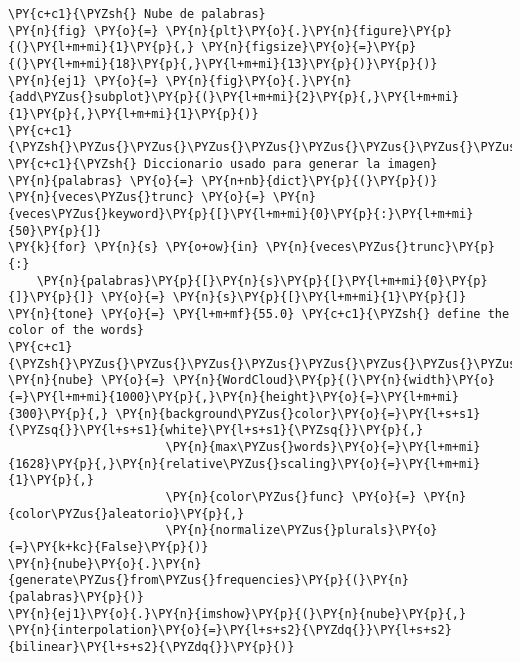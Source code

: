 \begin{tcolorbox}[breakable, size=fbox, boxrule=1pt, pad at break*=1mm,colback=cellbackground, colframe=cellborder]
\begin{Verbatim}[commandchars=\\\{\}]
\PY{c+c1}{\PYZsh{} Nube de palabras}
\PY{n}{fig} \PY{o}{=} \PY{n}{plt}\PY{o}{.}\PY{n}{figure}\PY{p}{(}\PY{l+m+mi}{1}\PY{p}{,} \PY{n}{figsize}\PY{o}{=}\PY{p}{(}\PY{l+m+mi}{18}\PY{p}{,}\PY{l+m+mi}{13}\PY{p}{)}\PY{p}{)}
\PY{n}{ej1} \PY{o}{=} \PY{n}{fig}\PY{o}{.}\PY{n}{add\PYZus{}subplot}\PY{p}{(}\PY{l+m+mi}{2}\PY{p}{,}\PY{l+m+mi}{1}\PY{p}{,}\PY{l+m+mi}{1}\PY{p}{)}
\PY{c+c1}{\PYZsh{}\PYZus{}\PYZus{}\PYZus{}\PYZus{}\PYZus{}\PYZus{}\PYZus{}\PYZus{}\PYZus{}\PYZus{}\PYZus{}\PYZus{}\PYZus{}\PYZus{}\PYZus{}\PYZus{}\PYZus{}\PYZus{}\PYZus{}\PYZus{}\PYZus{}\PYZus{}\PYZus{}\PYZus{}\PYZus{}\PYZus{}\PYZus{}\PYZus{}\PYZus{}\PYZus{}\PYZus{}\PYZus{}\PYZus{}\PYZus{}\PYZus{}\PYZus{}\PYZus{}\PYZus{}\PYZus{}\PYZus{}\PYZus{}\PYZus{}\PYZus{}\PYZus{}\PYZus{}\PYZus{}\PYZus{}\PYZus{}\PYZus{}\PYZus{}\PYZus{}\PYZus{}\PYZus{}\PYZus{}\PYZus{}}
\PY{c+c1}{\PYZsh{} Diccionario usado para generar la imagen}
\PY{n}{palabras} \PY{o}{=} \PY{n+nb}{dict}\PY{p}{(}\PY{p}{)}
\PY{n}{veces\PYZus{}trunc} \PY{o}{=} \PY{n}{veces\PYZus{}keyword}\PY{p}{[}\PY{l+m+mi}{0}\PY{p}{:}\PY{l+m+mi}{50}\PY{p}{]}
\PY{k}{for} \PY{n}{s} \PY{o+ow}{in} \PY{n}{veces\PYZus{}trunc}\PY{p}{:}
    \PY{n}{palabras}\PY{p}{[}\PY{n}{s}\PY{p}{[}\PY{l+m+mi}{0}\PY{p}{]}\PY{p}{]} \PY{o}{=} \PY{n}{s}\PY{p}{[}\PY{l+m+mi}{1}\PY{p}{]}
\PY{n}{tone} \PY{o}{=} \PY{l+m+mf}{55.0} \PY{c+c1}{\PYZsh{} define the color of the words}
\PY{c+c1}{\PYZsh{}\PYZus{}\PYZus{}\PYZus{}\PYZus{}\PYZus{}\PYZus{}\PYZus{}\PYZus{}\PYZus{}\PYZus{}\PYZus{}\PYZus{}\PYZus{}\PYZus{}\PYZus{}\PYZus{}\PYZus{}\PYZus{}\PYZus{}\PYZus{}\PYZus{}\PYZus{}\PYZus{}\PYZus{}\PYZus{}\PYZus{}\PYZus{}\PYZus{}\PYZus{}\PYZus{}\PYZus{}\PYZus{}\PYZus{}\PYZus{}\PYZus{}\PYZus{}\PYZus{}\PYZus{}\PYZus{}\PYZus{}\PYZus{}\PYZus{}\PYZus{}\PYZus{}\PYZus{}\PYZus{}\PYZus{}\PYZus{}\PYZus{}\PYZus{}\PYZus{}\PYZus{}\PYZus{}\PYZus{}\PYZus{}\PYZus{}}
\PY{n}{nube} \PY{o}{=} \PY{n}{WordCloud}\PY{p}{(}\PY{n}{width}\PY{o}{=}\PY{l+m+mi}{1000}\PY{p}{,}\PY{n}{height}\PY{o}{=}\PY{l+m+mi}{300}\PY{p}{,} \PY{n}{background\PYZus{}color}\PY{o}{=}\PY{l+s+s1}{\PYZsq{}}\PY{l+s+s1}{white}\PY{l+s+s1}{\PYZsq{}}\PY{p}{,} 
                      \PY{n}{max\PYZus{}words}\PY{o}{=}\PY{l+m+mi}{1628}\PY{p}{,}\PY{n}{relative\PYZus{}scaling}\PY{o}{=}\PY{l+m+mi}{1}\PY{p}{,}
                      \PY{n}{color\PYZus{}func} \PY{o}{=} \PY{n}{color\PYZus{}aleatorio}\PY{p}{,}
                      \PY{n}{normalize\PYZus{}plurals}\PY{o}{=}\PY{k+kc}{False}\PY{p}{)}
\PY{n}{nube}\PY{o}{.}\PY{n}{generate\PYZus{}from\PYZus{}frequencies}\PY{p}{(}\PY{n}{palabras}\PY{p}{)}
\PY{n}{ej1}\PY{o}{.}\PY{n}{imshow}\PY{p}{(}\PY{n}{nube}\PY{p}{,} \PY{n}{interpolation}\PY{o}{=}\PY{l+s+s2}{\PYZdq{}}\PY{l+s+s2}{bilinear}\PY{l+s+s2}{\PYZdq{}}\PY{p}{)}

\end{Verbatim}
\end{tcolorbox}
